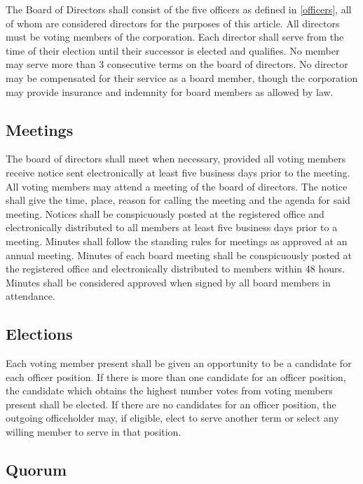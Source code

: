 \documentclass[10pt,letterpaper,titlepage]{article}
\begin{document}
The Board of Directors shall consist of the five officers as defined in
\ref{officers}, all of whom are considered directors for the purposes of this
article.
All directors must be voting members of the corporation.
Each director shall serve from the time of their election until their successor
is elected and qualifies.
No member may serve more than 3 consecutive terms on the board of directors.
No director may be compensated for their service as a board member, though the
corporation may provide insurance and indemnity for board members as allowed by
law.

\subsection{Meetings}

The board of directors shall meet when necessary, provided all voting members
receive notice sent electronically at least five business days prior to the
meeting.
All voting members may attend a meeting of the board of directors.
The notice shall give the time, place, reason for calling the meeting and the
agenda for said meeting.
Notices shall be conspicuously posted at the registered office and
electronically distributed to all members at least five business days prior to
a meeting.
Minutes shall follow the standing rules for meetings as approved at an annual
meeting.
Minutes of each board meeting shall be conspicuously posted at the registered
office and electronically distributed to members within 48 hours.
Minutes shall be considered approved when signed by all board members in
attendance.

\subsection{Elections}
\label{elections}

Each voting member present shall be given an opportunity to be a candidate for each
officer position.
If there is more than one candidate for an officer position, the candidate
which obtains the highest number votes from voting members present shall be
elected.
If there are no candidates for an officer position, the outgoing officeholder
may, if eligible, elect to serve another term or select any willing member to
serve in that position.

\subsection{Quorum}
\end{document}
